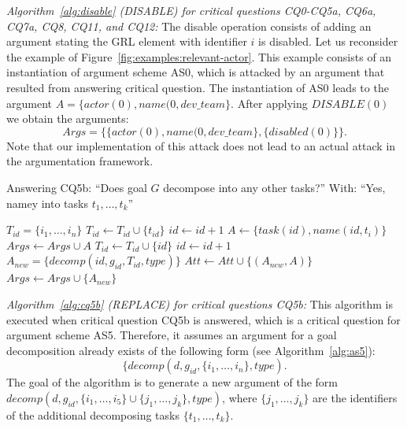 
\emph{Algorithm~\ref{alg:disable} (\textsf{DISABLE}) for critical questions CQ0-CQ5a, CQ6a, CQ7a, CQ8, CQ11, and CQ12:} The disable operation consists of adding an argument stating the GRL element with identifier $i$ is disabled. Let us reconsider the example of Figure~\ref{fig:examples:relevant-actor}. This example consists of an instantiation of argument scheme AS0, which is attacked by an argument that resulted from answering critical question. The instantiation of AS0 leads to the argument $A=\{actor(0),name(0,dev\_team\}$. After applying $DISABLE(0)$ we obtain the arguments: $$Args=\{\{actor(0),name(0,dev\_team\}, \{disabled(0)\}\}.$$ Note that our implementation of this attack does not lead to an actual attack in the argumentation framework.

\begin{algorithm}[h]
  \caption{Answering CQ5b: ``Does goal $G$ decompose into any other tasks?'' With: ``Yes, namey into tasks $t_1,\ldots,t_k$''}\label{alg:cq5b}
  \begin{algorithmic}[1]
    \State $T_{id} = \{i_1,\ldots,i_n\}$
    \label{alg:cq5b:for1}
        \State $T_{id} \gets T_{id} \cup \{t_{id}\}$
      \Else
        \State $id\gets id+1$
        \State $A \gets \{task(id),name(id,t_i)\}$
        \State $Args \gets Args\cup A$
        \State $T_{id} \gets T_{id} \cup \{id\}$
      \EndIf
    \EndFor
    \State $id\gets id+1$
    \State $A_{new} = \{decomp(id, g_{id}, T_{id}, type)\}$\label{alg:cq5b:newarg}
    \label{alg:cq5b:for2}
      \State $Att\gets Att \cup \{(A_{new},A)\}$
    \EndFor
    \State $Args \gets Args \cup \{A_{new}\}$
    \EndProcedure
  \end{algorithmic}
\end{algorithm}

\emph{Algorithm~\ref{alg:cq5b} (\textsf{REPLACE}) for critical questions CQ5b:} This algorithm is executed when critical question CQ5b is answered, which is a critical question for argument scheme AS5. Therefore, it assumes an argument for a goal decomposition already exists of the following form (see Algorithm~\ref{alg:as5}): $$\{decomp(d, g_{id}, \{i_1,\ldots,i_n\},type).$$  The goal of the algorithm is to generate a new argument of the form $decomp(d, g_{id}, \{i_1,\ldots,i_5\}\cup \{j_1,\ldots,j_k\}, type)$, where $\{j_1,\ldots,j_k\}$ are the identifiers of the additional decomposing tasks $\{t_1,\ldots,t_k\}$.

